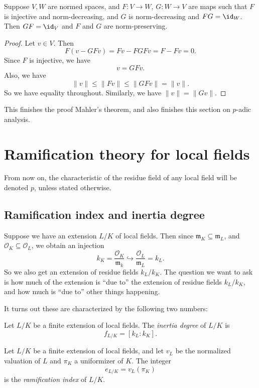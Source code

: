 \documentclass[a4paper]{article}
\begin{document}
\begin{lemma}
  Suppose $V, W$ are normed spaces, and $F: V \to W$, $G: W \to V$ are maps such that $F$ is injective and norm-decreasing, and $G$ is norm-decreasing and $FG = \id_W$. Then $GF = \id_V$ and $F$ and $G$ are norm-preserving.
\end{lemma}

\begin{proof}
  Let $v \in V$. Then
  \[
    F(v - GFv) = Fv - FGF v = F - Fv = 0.
  \]
  Since $F$ is injective, we have
  \[
    v = GF v.
  \]
  Also, we have
  \[
    \|v\| \leq \|Fv\| \leq \|GFv\| = \|v\|.
  \]
  So we have equality throughout. Similarly, we have $\|v\| = \|Gv\|$.
\end{proof}
This finishes the proof Mahler's theorem, and also finishes this section on $p$-adic analysis.

\section{Ramification theory for local fields}
From now on, the characteristic of the residue field of any local field will be denoted $p$, unless stated otherwise.

\subsection{Ramification index and inertia degree}
Suppose we have an extension $L/K$ of local fields. Then since $\mathfrak{m}_K \subseteq \mathfrak{m}_L$, and $\mathcal{O}_K \subseteq \mathcal{O}_L$, we obtain an injection
\[
  k_K = \frac{\mathcal{O}_K}{\mathfrak{m}_k} \hookrightarrow \frac{\mathcal{O}_L}{\mathfrak{m}_L} = k_L.
\]
So we also get an extension of residue fields $k_L/k_K$. The question we want to ask is how much of the extension is ``due to'' the extension of residue fields $k_L/k_K$, and how much is ``due to'' other things happening.

It turns out these are characterized by the following two numbers:
\begin{defi}
  Let $L/K$ be a finite extension of local fields. The \emph{inertia degree} of $L/K$ is
  \[
    f_{L/K} = [k_L:k_K].
  \]
\end{defi}

\begin{defi}
  Let $L/K$ be a finite extension of local fields, and let $v_L$ be the normalized valuation of $L$ and $\pi_K$ a uniformizer of $K$. The integer
  \[
    e_{L/K} = v_L(\pi_K)
  \]
  is the \emph{ramification index} of $L/K$.
\end{defi}
\end{document}
